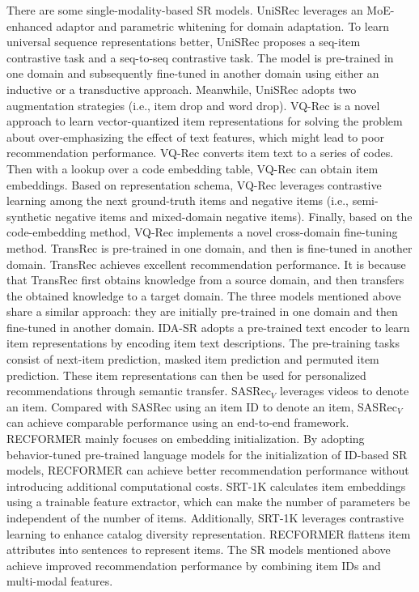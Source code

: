 \documentclass[review]{fcs}
\begin{document}
	There are some single-modality-based SR models. UniSRec \cite{UniSRec} leverages an MoE-enhanced adaptor and parametric whitening for domain adaptation. To learn universal sequence representations better, UniSRec proposes a seq-item contrastive task and a seq-to-seq contrastive task. The model is pre-trained in one domain and subsequently fine-tuned in another domain using either an inductive or a transductive approach. Meanwhile, UniSRec adopts two augmentation strategies (i.e., item drop and word drop). VQ-Rec \cite{VQ-Rec} is a novel approach to learn vector-quantized item representations for solving the problem about over-emphasizing the effect of text features, which might lead to poor recommendation performance. VQ-Rec converts item text to a series of codes. Then with a lookup over a code embedding table, VQ-Rec can obtain item embeddings. Based on representation schema, VQ-Rec leverages contrastive learning among the next ground-truth items and negative items (i.e., semi-synthetic negative items and mixed-domain negative items). Finally, based on the code-embedding method, VQ-Rec implements a novel cross-domain fine-tuning method. TransRec \cite{TransRec_n} is pre-trained in one domain, and then is fine-tuned in another domain. TransRec \cite{TransRec_n} achieves excellent recommendation performance. It is because that TransRec \cite{TransRec_n} first obtains knowledge from a source domain, and then transfers the obtained knowledge to a target domain. The three models mentioned above share a similar approach: they are initially pre-trained in one domain and then fine-tuned in another domain. IDA-SR \cite{IDA-SR} adopts a pre-trained text encoder to learn item representations by encoding item text descriptions. The pre-training tasks consist of next-item prediction, masked item prediction and permuted item prediction. These item representations can then be used for personalized recommendations through semantic transfer. SASRec$_{V}$ \cite{SASRecV} leverages videos to denote an item. Compared with SASRec using an item ID to denote an item, SASRec$_{V}$ \cite{SASRecV} can achieve comparable performance using an end-to-end framework. RECFORMER \cite{RECFORMER2} mainly focuses on embedding initialization. By adopting behavior-tuned pre-trained language models for the initialization of ID-based SR models, RECFORMER \cite{RECFORMER2} can achieve better recommendation performance without introducing additional computational costs. SRT-1K \cite{SRT-1K} calculates item embeddings using a trainable feature extractor, which can make the number of parameters be independent of the number of items. Additionally, SRT-1K \cite{SRT-1K} leverages contrastive learning to enhance catalog diversity representation. RECFORMER \cite{RECFORMER} flattens item attributes into sentences to represent items. The SR models mentioned above achieve improved recommendation performance by combining item IDs and multi-modal features.
	
\end{document}
